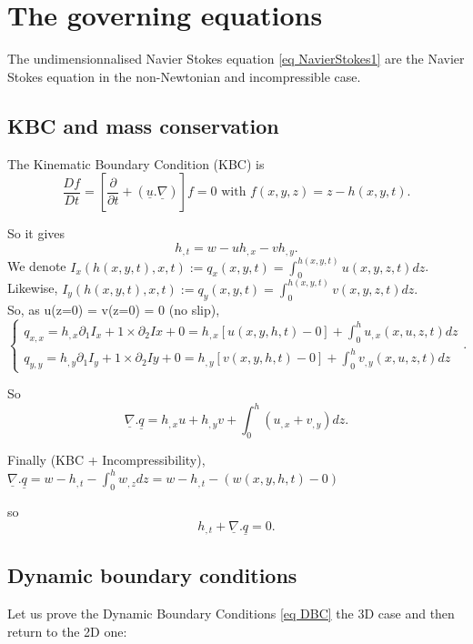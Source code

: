 \documentclass[12pt]{article}
\begin{document}
\section{The governing equations}
The undimensionnalised Navier Stokes  equation \eqref{eq NavierStokes1} are the Navier Stokes equation in the non-Newtonian and incompressible case. 

\subsection{KBC and mass conservation}
The Kinematic Boundary Condition (KBC) is $$\frac{Df}{Dt}=\left[\frac{\partial}{\partial t}+(\underline{u}.\underline{\nabla})\right]f=0 \text{  with } f(x, y, z) = z-h(x, y, t).$$

So it gives $$h_{,t}=w-uh_{,x}-vh_{,y}.$$
We denote 
$I_x(h(x, y, t), x,t):=q_{x}(x,y,t)=\int_{0}^{h(x, y, t)}u(x, y, z,t)dz$. Likewise, 
$I_y(h(x, y, t), x,t):=q_y(x, y, t)= \int_{0}^{h(x, y, t)}v(x, y, z,t)dz.$\\

So, as u(z=0) = v(z=0) = 0 (no slip),
\begin{equation*}
\left\{
\begin{aligned}
    q_{x,x}=h_{,x}\partial_1I_x+1\times\partial_2Ix+0= h_{,x}[u(x, y,h,t)-0] + \int_{0}^h u_{,x}(x, u, z, t)dz\\
    q_{y,y}=h_{,y}\partial_1I_y+1\times\partial_2Iy+0= h_{,y}[v(x, y,h,t)-0] + \int_{0}^h v_{,y}(x, u, z, t)dz
\end{aligned}
\right..
\end{equation*}


So 
\begin{equation}
    \underline{\nabla}.\underline{q}=h_{,x}u+h_{,y}v+\int_{0}^h(u_{,x}+v_{,y})dz.
\end{equation}

Finally (KBC + Incompressibility),
$\underline{\nabla}.\underline{q}=w-h_{,t} - \int_{0}^h w_{,z}dz = w-h_{,t}-(w(x, y, h, t) - 0)$ 

so 
\begin{equation}
\boxed{
h_{,t}+\underline{\nabla}.\underline{q}=0.}
\end{equation}


\subsection{Dynamic boundary conditions}
Let us prove the Dynamic Boundary Conditions \eqref{eq DBC} the 3D case and then return to the 2D one:
\end{document}
